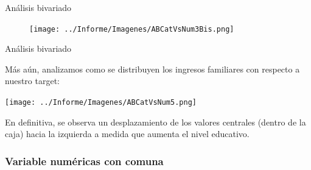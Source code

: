 \documentclass[pdf]{beamer}
\begin{document}
{\begin{frame}{Análisis bivariado}
    \begin{figure}
        \texttt{[image: ../Informe/Imagenes/ABCatVsNum3Bis.png]}
    \end{figure}

\end{frame}


 
 
 




\begin{frame}{Análisis bivariado}

    Más aún, analizamos como se distribuyen los ingresos familiares con respecto a nuestro target:

    \begin{center}
        \texttt{[image: ../Informe/Imagenes/ABCatVsNum5.png]}
    \end{center}

    En definitiva, se observa un desplazamiento de los valores centrales (dentro de la caja) hacia la izquierda a medida que aumenta el nivel educativo.


\end{frame}

    \subsubsection{Variable numéricas con comuna}

}
\end{document}
